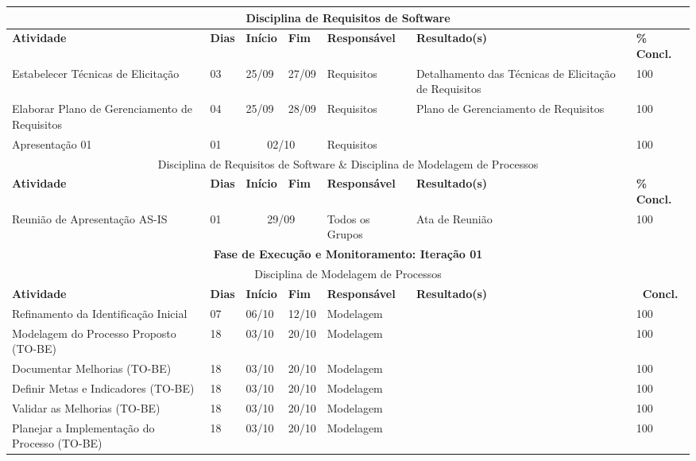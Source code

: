 \begin{center}
	\begin{tabular}{|m{6cm}|m{1cm}|m{1cm}|m{1cm}|m{4cm}|m{6cm}|m{2cm}|}
	\hline
	\multicolumn{7}{|c|}{Disciplina de Requisitos de Software} \\
	\hline
	\textbf{Atividade} & \textbf{Dias} & \textbf{Início} & \textbf{Fim} & \textbf{Responsável} & \textbf{Resultado(s)} & \textbf{\% Concl.} \\ \hline
	Estabelecer Técnicas de Elicitação & 03 & 25/09 & 27/09 & Requisitos & Detalhamento das Técnicas de Elicitação de Requisitos & 100 \\ \hline
	Elaborar Plano de Gerenciamento de Requisitos & 04 & 25/09 & 28/09 & Requisitos & Plano de Gerenciamento de Requisitos & 100 \\ \hline
	Apresentação 01 & 01 & \multicolumn{2}{c|}{02/10} & Requisitos & & 100 \\ \hline
	\multicolumn{7}{|c|}{Disciplina de Requisitos de Software \& Disciplina de Modelagem de Processos} \\ \hline
	\textbf{Atividade} & \textbf{Dias} & \textbf{Início} & \textbf{Fim} & \textbf{Responsável} & \textbf{Resultado(s)} & \textbf{\% Concl.} \\ \hline
	Reunião de Apresentação AS-IS & 01 & \multicolumn{2}{c|}{29/09} & Todos os Grupos & Ata de Reunião & 100 \\ \hline
	\multicolumn{7}{|c|}{\textbf{Fase de Execução e Monitoramento: Iteração 01}} \\
	\hline
	\multicolumn{7}{|c|}{Disciplina de Modelagem de Processos} \\
	\hline
	\textbf{Atividade} & \textbf{Dias} & \textbf{Início} & \textbf{Fim} & \textbf{Responsável} & \textbf{Resultado(s)} & \textbf{\ Concl.} \\ \hline
	Refinamento da Identificação Inicial & 07 & 06/10 & 12/10 & Modelagem & & 100 \\ \hline
	Modelagem do Processo Proposto (TO-BE) & 18 & 03/10 & 20/10 & Modelagem & & 100 \\ \hline
	Documentar Melhorias (TO-BE) & 18 & 03/10 & 20/10 & Modelagem & & 100 \\ \hline
	Definir Metas e Indicadores (TO-BE) & 18 & 03/10 & 20/10 & Modelagem & & 100 \\ \hline
	Validar as Melhorias (TO-BE) & 18 & 03/10 & 20/10 & Modelagem & & 100 \\ \hline
	Planejar a Implementação do Processo (TO-BE) & 18 & 03/10 & 20/10 & Modelagem & & 100 \\ \hline
	\end{tabular}
\end{center}

